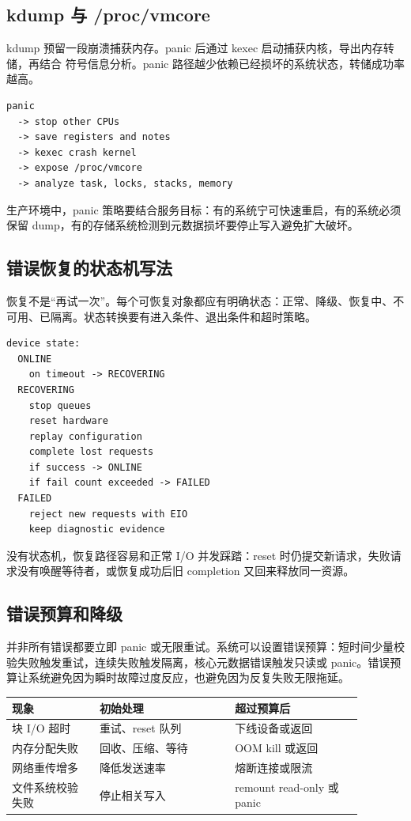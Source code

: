 \subsection{kdump 与 /proc/vmcore}

kdump 预留一段崩溃捕获内存。panic 后通过 kexec 启动捕获内核，导出内存转储，再结合
符号信息分析。panic 路径越少依赖已经损坏的系统状态，转储成功率越高。

\begin{lstlisting}
panic
  -> stop other CPUs
  -> save registers and notes
  -> kexec crash kernel
  -> expose /proc/vmcore
  -> analyze task, locks, stacks, memory
\end{lstlisting}

生产环境中，panic 策略要结合服务目标：有的系统宁可快速重启，有的系统必须保留 dump，有的存储系统检测到元数据损坏要停止写入避免扩大破坏。

\subsection{错误恢复的状态机写法}

恢复不是“再试一次”。每个可恢复对象都应有明确状态：正常、降级、恢复中、不可用、已隔离。状态转换要有进入条件、退出条件和超时策略。

\begin{lstlisting}
device state:
  ONLINE
    on timeout -> RECOVERING
  RECOVERING
    stop queues
    reset hardware
    replay configuration
    complete lost requests
    if success -> ONLINE
    if fail count exceeded -> FAILED
  FAILED
    reject new requests with EIO
    keep diagnostic evidence
\end{lstlisting}

没有状态机，恢复路径容易和正常 I/O 并发踩踏：reset 时仍提交新请求，失败请求没有唤醒等待者，或恢复成功后旧 completion 又回来释放同一资源。

\subsection{错误预算和降级}

并非所有错误都要立即 panic 或无限重试。系统可以设置错误预算：短时间少量校验失败触发重试，连续失败触发隔离，核心元数据错误触发只读或 panic。错误预算让系统避免因为瞬时故障过度反应，也避免因为反复失败无限拖延。

\begin{longtable}{|L{0.22\linewidth}|L{0.34\linewidth}|L{0.32\linewidth}|}
\toprule
现象 & 初始处理 & 超过预算后 \\
\midrule
块 I/O 超时 & 重试、reset 队列 & 下线设备或返回  \\\tablerowrule
内存分配失败 & 回收、压缩、等待 & OOM kill 或返回  \\\tablerowrule
网络重传增多 & 降低发送速率 & 熔断连接或限流 \\\tablerowrule
文件系统校验失败 & 停止相关写入 & remount read-only 或 panic \\
\bottomrule
\end{longtable}

